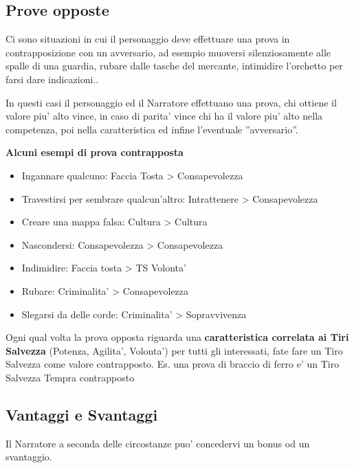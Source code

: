 \documentclass[a4paper,11pt,twoside,openany]{book}
\begin{document}
\subsection{Prove opposte}

Ci sono situazioni in cui il personaggio deve effettuare una prova in contrapposizione con un avversario, ad esempio muoversi silenziosamente alle spalle di una guardia, rubare dalle tasche del mercante, intimidire l'orchetto per farsi dare indicazioni..

In questi casi il personaggio ed il Narratore effettuano una prova, chi ottiene il valore piu' alto vince, in caso di parita' vince chi ha il valore piu' alto nella competenza, poi nella caratteristica ed infine l'eventuale ''avversario''.

\bigskip

\textbf{Alcuni esempi di prova contrapposta}

\begin{itemize}
\item Ingannare qualcuno: Faccia Tosta \textgreater{} Consapevolezza
\item Travestirsi per sembrare qualcun'altro: Intrattenere \textgreater{} Consapevolezza
\item Creare una mappa falsa: Cultura \textgreater{} Cultura
\item Nascondersi: Consapevolezza \textgreater{} Consapevolezza
\item Indimidire: Faccia tosta \textgreater{} TS Volonta'
\item Rubare: Criminalita' \textgreater{} Consapevolezza
\item Slegarsi da delle corde: Criminalita' \textgreater{} Sopravvivenza
\end{itemize}

Ogni qual volta la prova opposta riguarda una \textbf{caratteristica correlata ai Tiri Salvezza} (Potenza, Agilita', Volonta') per tutti gli interessati, fate fare un Tiro Salvezza come valore contrapposto. Es. una prova di braccio di ferro e' un Tiro Salvezza Tempra contrapposto

\bigskip

\subsection{Vantaggi e Svantaggi}

Il Narratore a seconda delle circostanze puo' concedervi un bonus od un svantaggio.

\bigskip
\end{document}
